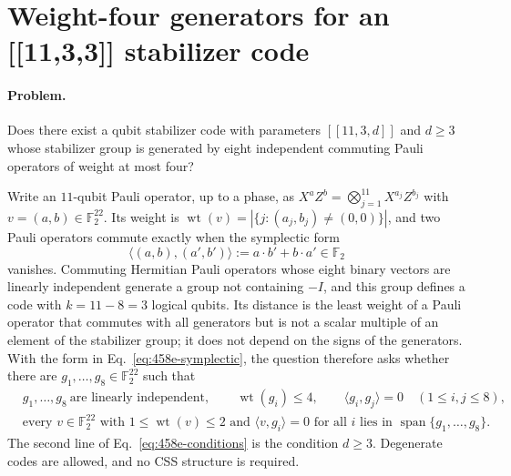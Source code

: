 \section{Weight-four generators for an [[11,3,3]] stabilizer code}
\label{sec:op_458e9e86ccbddccb}

\paragraph{Problem.}
Does there exist a qubit stabilizer code with parameters $[[11,3,d]]$ and $d\geq3$ whose stabilizer group is generated by eight independent commuting Pauli operators of weight at most four?

Write an $11$-qubit Pauli operator, up to a phase, as $X^{a}Z^{b}=\bigotimes_{j=1}^{11}X^{a_j}Z^{b_j}$ with $v=(a,b)\in\mathbb F_2^{22}$. Its weight is $\operatorname{wt}(v)=|\{j:(a_j,b_j)\neq(0,0)\}|$, and two Pauli operators commute exactly when the symplectic form
\begin{equation}
  \langle(a,b),(a',b')\rangle:=a\cdot b'+b\cdot a'\in\mathbb F_2
  \label{eq:458e-symplectic}
\end{equation}
vanishes. Commuting Hermitian Pauli operators whose eight binary vectors are linearly independent generate a group not containing $-I$, and this group defines a code with $k=11-8=3$ logical qubits. Its distance is the least weight of a Pauli operator that commutes with all generators but is not a scalar multiple of an element of the stabilizer group; it does not depend on the signs of the generators. With the form in Eq.~\eqref{eq:458e-symplectic}, the question therefore asks whether there are $g_1,\dots,g_8\in\mathbb F_2^{22}$ such that
\begin{equation}
  \begin{aligned}
    &g_1,\dots,g_8\ \text{are linearly independent},\qquad \operatorname{wt}(g_i)\leq4,\qquad \langle g_i,g_j\rangle=0\quad(1\leq i,j\leq8),\\
    &\text{every } v\in\mathbb F_2^{22} \text{ with } 1\leq\operatorname{wt}(v)\leq2 \text{ and } \langle v,g_i\rangle=0 \text{ for all } i \text{ lies in } \operatorname{span}\{g_1,\dots,g_8\}.
  \end{aligned}
  \label{eq:458e-conditions}
\end{equation}
The second line of Eq.~\eqref{eq:458e-conditions} is the condition $d\geq3$. Degenerate codes are allowed, and no CSS structure is required.

